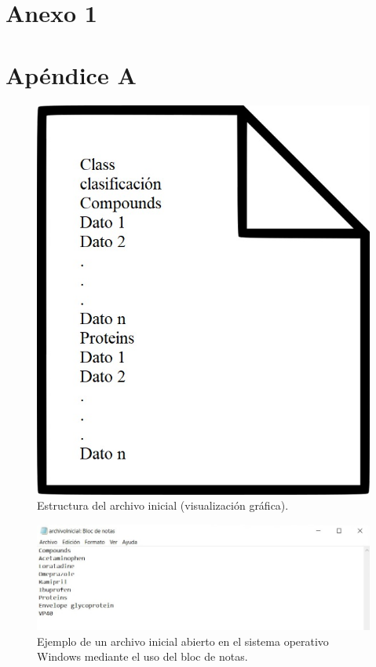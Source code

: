 \rhead{\newtitle}
\cfoot{\thepage}
\renewcommand{\headrulewidth}{1pt}
\renewcommand{\footrulewidth}{1pt}
\chapter*{Anexo 1}

\rhead{\newtitle}
\cfoot{\thepage}
\renewcommand{\headrulewidth}{1pt}
\renewcommand{\footrulewidth}{1pt}
\chapter*{Apéndice A}

\begin{figure}[H]
    \centering
    \includegraphics[scale=0.50]{Anexo/imagenes/figuraA-1-1.jpeg}
    \caption{Estructura del archivo inicial (visualización gráfica).}
    \label{A-1-1}
\end{figure}

\begin{figure}[H]
    \centering
    \includegraphics[scale=0.85]{Anexo/imagenes/figuraA-1-2.jpg}
    \caption{Ejemplo de un archivo inicial abierto en el sistema operativo Windows mediante el uso del bloc de notas.}
    \label{A-1-2}
\end{figure}

